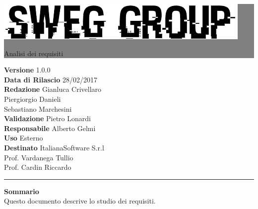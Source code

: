 \documentclass[12pt,a4paper,titlepage]{article}
\newcommand{\HRule}[1]{\hfill \rule{0.2\linewidth}{#1}} %
\begin{document}
	
	\thispagestyle{empty} %
	
	
	\colorbox{grey}{
		\parbox[t]{0.91\linewidth}{
			\centering \fontsize{50pt}{80pt}\selectfont %
			\vspace*{0.7cm} %
			
			\raggedleft
			\includegraphics[width=\linewidth]{../../LogoSWEgGroupSFONDOVUOTO}
			
			\hfill Analisi dei requisiti \\
			
			\vspace*{0.7cm} %
		}
	}
	
	
	\vfill %
	
	
	{\centering \large 
		\hfill \textbf{Versione} 			1.0.0 \\		
		\hfill \textbf{Data di Rilascio}	28/02/2017 \\ 
		\hfill \textbf{Redazione} 			Gianluca Crivellaro \\
		\hfill								Piergiorgio Danieli \\
		\hfill								Sebastiano Marchesini \\
		\hfill \textbf{Validazione} 		Pietro Lonardi \\
		\hfill \textbf{Responsabile}		Alberto Gelmi \\
		\hfill \textbf{Uso} 				Esterno \\
		\hfill \textbf{Destinato} 			ItalianaSoftware S.r.l \\
		\hfill								Prof. Vardanega Tullio \\ 
		\hfill								Prof. Cardin Riccardo \\
		
		\HRule{1pt}
		
		\textbf{Sommario} \\
		Questo documento descrive lo studio dei requisiti.
		
	} %
	
\end{document}
